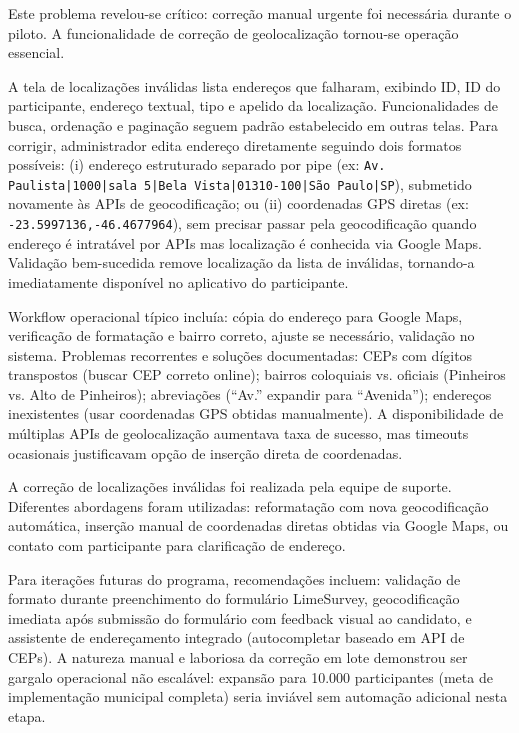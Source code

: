 Este problema revelou-se crítico: correção manual urgente foi necessária durante o piloto. A funcionalidade de correção de geolocalização tornou-se operação essencial.

A tela de localizações inválidas lista endereços que falharam, exibindo ID, ID do participante, endereço textual, tipo e apelido da localização. Funcionalidades de busca, ordenação e paginação seguem padrão estabelecido em outras telas. Para corrigir, administrador edita endereço diretamente seguindo dois formatos possíveis: (i) endereço estruturado separado por pipe (ex: \texttt{Av. Paulista|1000|sala 5|Bela Vista|01310-100|São Paulo|SP}), submetido novamente às APIs de geocodificação; ou (ii) coordenadas GPS diretas (ex: \texttt{-23.5997136,-46.4677964}), sem precisar passar pela geocodificação quando endereço é intratável por APIs mas localização é conhecida via Google Maps. Validação bem-sucedida remove localização da lista de inválidas, tornando-a imediatamente disponível no aplicativo do participante.

Workflow operacional típico incluía: cópia do endereço para Google Maps, verificação de formatação e bairro correto, ajuste se necessário, validação no sistema. Problemas recorrentes e soluções documentadas: CEPs com dígitos transpostos (buscar CEP correto online); bairros coloquiais vs. oficiais (Pinheiros vs. Alto de Pinheiros); abreviações (``Av.'' expandir para ``Avenida''); endereços inexistentes (usar coordenadas GPS obtidas manualmente). A disponibilidade de múltiplas APIs de geolocalização aumentava taxa de sucesso, mas timeouts ocasionais justificavam opção de inserção direta de coordenadas.

A correção de localizações inválidas foi realizada pela equipe de suporte. Diferentes abordagens foram utilizadas: reformatação com nova geocodificação automática, inserção manual de coordenadas diretas obtidas via Google Maps, ou contato com participante para clarificação de endereço.

Para iterações futuras do programa, recomendações incluem: validação de formato durante preenchimento do formulário LimeSurvey, geocodificação imediata após submissão do formulário com feedback visual ao candidato, e assistente de endereçamento integrado (autocompletar baseado em API de CEPs). A natureza manual e laboriosa da correção em lote demonstrou ser gargalo operacional não escalável: expansão para 10.000 participantes (meta de implementação municipal completa) seria inviável sem automação adicional nesta etapa.


